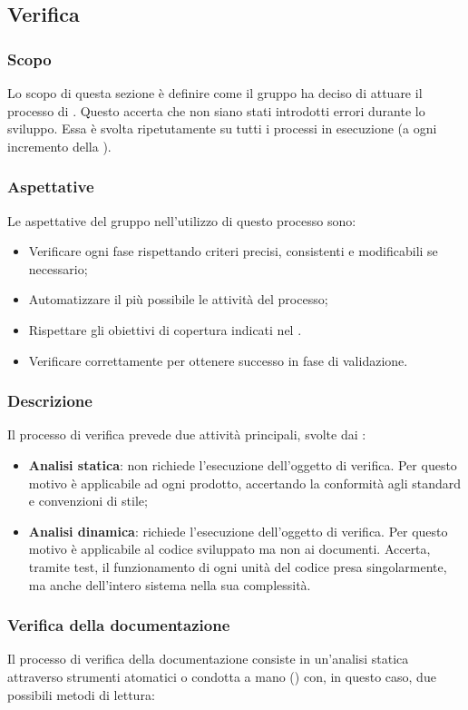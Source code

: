 \subsection{Verifica}
\subsubsection{Scopo}
Lo scopo di questa sezione è definire come il gruppo ha deciso di attuare il processo di . Questo accerta che non siano stati introdotti errori durante lo sviluppo. Essa è svolta ripetutamente su tutti i processi in esecuzione (a ogni incremento della ).

\subsubsection{Aspettative}
Le aspettative del gruppo \Gruppo{} nell'utilizzo di questo processo sono:
\begin{itemize}
	\item Verificare ogni fase rispettando criteri precisi, consistenti e modificabili se necessario;
	\item Automatizzare il più possibile le attività del processo;
	\item Rispettare gli obiettivi di copertura indicati nel \PdQv.
	\item Verificare correttamente per ottenere successo in fase di validazione.
\end{itemize}

\subsubsection{Descrizione}
Il processo di verifica prevede due attività principali, svolte dai  :
\begin{itemize}
	\item \textbf{Analisi statica}: non richiede l'esecuzione dell'oggetto di verifica. Per questo motivo è applicabile ad ogni prodotto, accertando la conformità agli standard e convenzioni di stile;
	\item \textbf{Analisi dinamica}: richiede l'esecuzione dell'oggetto di verifica. Per questo motivo è applicabile al codice sviluppato ma non ai documenti. Accerta, tramite test, il funzionamento di ogni unità del codice presa singolarmente, ma anche dell'intero sistema nella sua complessità.
\end{itemize}

\subsubsection{Verifica della documentazione}
Il processo di verifica della documentazione consiste in un'analisi statica attraverso strumenti atomatici o condotta a mano () con, in questo caso, due possibili metodi di lettura:   


